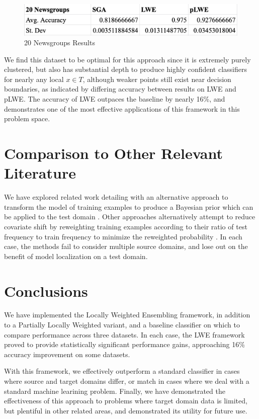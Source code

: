 \documentclass[12pt]{article}
\begin{document}
    \begin{figure}[h]
      \centering
      \includegraphics[width=.75\textwidth]{20-newsgroups.png}
      \caption{20 Newsgroups Results}
      \label{newsgroups-fig}
    \end{figure}

    We find this dataset to be optimal for this approach since it is extremely purely clustered, but also has substantial depth to produce highly confident classifiers for nearly any local $x \in T$, although weaker points still exist near decision boundaries, as indicated by differing accuracy between results on LWE and pLWE. The accuracy of LWE outpaces the baseline by nearly 16\%, and demonstrates one of the most effective applications of this framework in this problem space.

    \section{Comparison to Other Relevant Literature} \label{literature}

    We have explored related work detailing with an alternative approach to transform the model of training examples to produce a Bayesian prior which can be applied to the test domain \autocite{bayesian-prior}. Other approaches alternatively attempt to reduce covariate shift by reweighting training examples according to their ratio of test frequency to train frequency to minimize the reweighted probability \autocite{shimodaira_2000}. In each case, the methods fail to consider multiple source domains, and lose out on the benefit of model localization on a test domain.
    \section{Conclusions}

    We have implemented the Locally Weighted Ensembling framework, in addition to a Partially Locally Weighted variant, and a baseline classifier on which to compare performance across three datasets. In each case, the LWE framework proved to provide statistically significant performance gains, approaching 16\% accuracy improvement on some datasets.

    With this framework, we effectively outperform a standard classifier in cases where source and target domains differ, or match in cases where we deal with a standard machine learining problem. Finally, we have demonstrated the effectiveness of this approach to problems where target domain data is limited, but plentiful in other related areas, and demonstrated its utility for future use.

    \newpage
    \printbibliography
\end{document}
